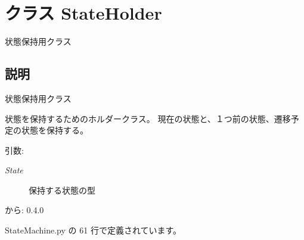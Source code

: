 \section{クラス StateHolder}
\label{classsource__py_1_1_state_machine_1_1_state_holder}
状態保持用クラス  




\subsection{説明}
状態保持用クラス 

状態を保持するためのホルダークラス。 現在の状態と、１つ前の状態、遷移予定の状態を保持する。

\begin{Desc}
\item[引数:]
\begin{description}
\item[{\em State}]保持する状態の型\end{description}
\end{Desc}
\begin{Desc}
\item[から:]0.4.0 \end{Desc}


 StateMachine.py の 61 行で定義されています。